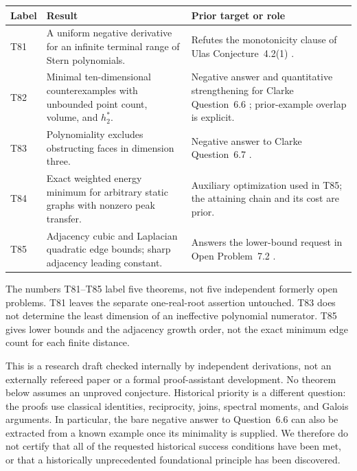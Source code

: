 \documentclass[11pt,a4paper]{article}
\theoremstyle{definition}\newtheorem{definition}[lemma]{Definition}
\theoremstyle{remark}\newtheorem{remark}[lemma]{Remark}
\begin{document}
\begin{center}\small
\begin{tabular}{@{}p{}p{}p{}@{}}
\toprule
Label & Result & Prior target or role \\
\midrule
T81 & A uniform negative derivative for an infinite terminal range of Stern polynomials. & Refutes the monotonicity clause of Ulas Conjecture~4.2(1) \cite{Ulas20}.\\
T82 & Minimal ten-dimensional counterexamples with unbounded point count, volume, and $h^*_2$. & Negative answer and quantitative strengthening for Clarke Question~6.6 \cite{Clarke26}; prior-example overlap is explicit.\\
T83 & Polynomiality excludes obstructing faces in dimension three. & Negative answer to Clarke Question~6.7 \cite{Clarke26}.\\
T84 & Exact weighted energy minimum for arbitrary static graphs with nonzero peak transfer. & Auxiliary optimization used in T85; the attaining chain and its cost are prior.\\
T85 & Adjacency cubic and Laplacian quadratic edge bounds; sharp adjacency leading constant. & Answers the lower-bound request in Open Problem~7.2 \cite{CGS25}.\\
\bottomrule
\end{tabular}
\end{center}

The numbers T81--T85 label five theorems, not five independent formerly
open problems. T81 leaves the separate one-real-root assertion untouched.
T83 does not determine the least dimension of an ineffective polynomial
numerator. T85 gives lower bounds and the adjacency growth order, not the
exact minimum edge count for each finite distance.

This is a research draft checked internally by independent derivations,
not an externally refereed paper or a formal proof-assistant development.
No theorem below assumes an unproved conjecture. Historical priority is
a different question: the proofs use classical identities, reciprocity,
joins, spectral moments, and Galois arguments. In particular, the bare
negative answer to Question~6.6 can also be extracted from a known example
once its minimality is supplied. We therefore do not certify that all of
the requested historical success conditions have been met, or that a
historically unprecedented foundational principle has been discovered.
\end{document}
